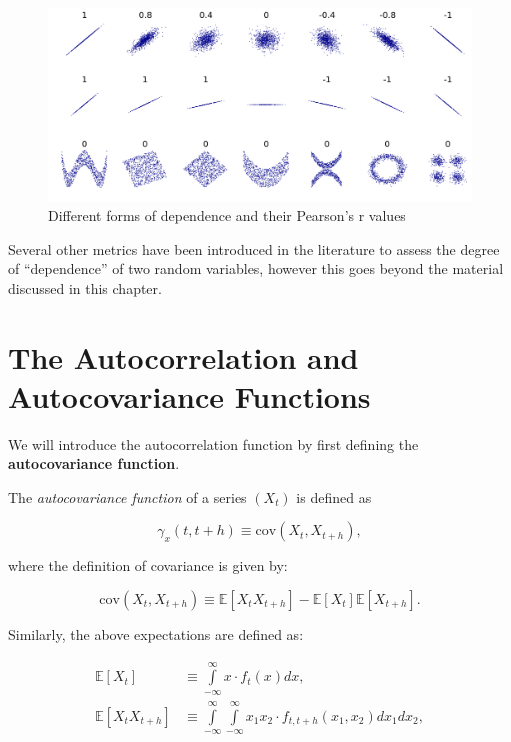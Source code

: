 \documentclass[]{book}
\theoremstyle{definition}
\theoremstyle{definition}
\theoremstyle{definition}
\theoremstyle{remark}
\let\BeginKnitrBlock\begin \let\EndKnitrBlock\end
\begin{document}
\begin{figure}

{\centering \includegraphics{images/corr_example} 

}

\caption{Different forms of dependence and their Pearson's r values}\label{fig:correxample}
\end{figure}

Several other metrics have been introduced in the literature to assess
the degree of ``dependence'' of two random variables, however this goes
beyond the material discussed in this chapter.

\section{The Autocorrelation and Autocovariance
Functions}\label{the-autocorrelation-and-autocovariance-functions}

We will introduce the autocorrelation function by first defining the
\textbf{autocovariance function}.

\BeginKnitrBlock{definition}
\protect\hypertarget{def:acvf}{}{\label{def:acvf} }The \emph{autocovariance
function} of a series \((X_t)\) is defined as

\[{\gamma_x}\left( {t,t+h} \right) \equiv \text{cov} \left( {{X_t},{X_{t+h}}} \right),\]
\EndKnitrBlock{definition}

where the definition of covariance is given by:

\[
    \text{cov} \left( {{X_t},{X_{t+h}}} \right) \equiv \mathbb{E}\left[ {{X_t}{X_{t+h}}} \right] - \mathbb{E}\left[ {{X_t}} \right]\mathbb{E}\left[ {{X_{t+h}}} \right].
    \]

Similarly, the above expectations are defined as:

\[\begin{aligned}
     \mathbb{E}\left[ {{X_t}} \right] &\equiv \int\limits_{ - \infty }^\infty  {x \cdot {f_t}\left( x \right)dx},  \\
     \mathbb{E}\left[ {{X_t}{X_{t+h}}} \right] &\equiv \int\limits_{ - \infty }^\infty  {\int\limits_{ - \infty }^\infty  {{x_1}{x_2} \cdot f_{t,t+h}\left( {{x_1},{x_2}} \right)d{x_1}d{x_2}} } ,
     \end{aligned} \]
\end{document}
